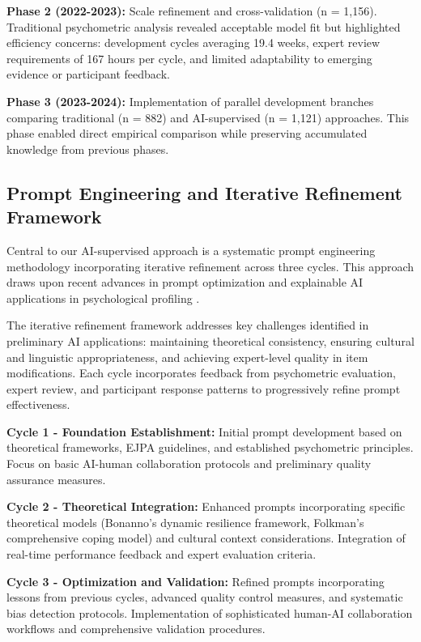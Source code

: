 \documentclass[12pt,a4paper]{article}
\begin{document}
\textbf{Phase 2 (2022-2023):} Scale refinement and cross-validation (n = 1,156). Traditional psychometric analysis revealed acceptable model fit but highlighted efficiency concerns: development cycles averaging 19.4 weeks, expert review requirements of 167 hours per cycle, and limited adaptability to emerging evidence or participant feedback.

\textbf{Phase 3 (2023-2024):} Implementation of parallel development branches comparing traditional (n = 882) and AI-supervised (n = 1,121) approaches. This phase enabled direct empirical comparison while preserving accumulated knowledge from previous phases.

\subsection{Prompt Engineering and Iterative Refinement Framework}

Central to our AI-supervised approach is a systematic prompt engineering methodology incorporating iterative refinement across three cycles. This approach draws upon recent advances in prompt optimization \cite{Li2024} and explainable AI applications in psychological profiling \cite{Ramon2021}.

The iterative refinement framework addresses key challenges identified in preliminary AI applications: maintaining theoretical consistency, ensuring cultural and linguistic appropriateness, and achieving expert-level quality in item modifications. Each cycle incorporates feedback from psychometric evaluation, expert review, and participant response patterns to progressively refine prompt effectiveness.

\textbf{Cycle 1 - Foundation Establishment:} Initial prompt development based on theoretical frameworks, EJPA guidelines, and established psychometric principles. Focus on basic AI-human collaboration protocols and preliminary quality assurance measures.

\textbf{Cycle 2 - Theoretical Integration:} Enhanced prompts incorporating specific theoretical models (Bonanno's dynamic resilience framework, Folkman's comprehensive coping model) and cultural context considerations. Integration of real-time performance feedback and expert evaluation criteria.

\textbf{Cycle 3 - Optimization and Validation:} Refined prompts incorporating lessons from previous cycles, advanced quality control measures, and systematic bias detection protocols. Implementation of sophisticated human-AI collaboration workflows and comprehensive validation procedures.
\end{document}

